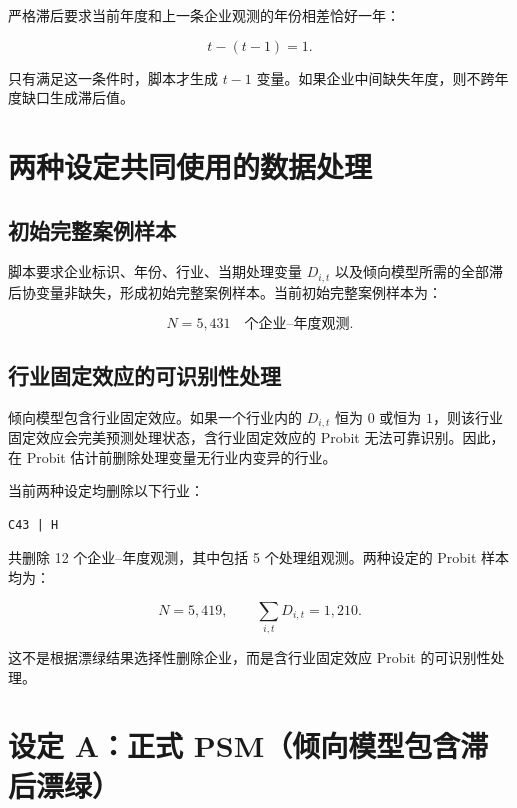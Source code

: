 \documentclass[12pt,a4paper]{article}
\begin{document}
严格滞后要求当前年度和上一条企业观测的年份相差恰好一年：

\begin{equation}
    t-(t-1)=1.
\end{equation}

只有满足这一条件时，脚本才生成 $t-1$ 变量。如果企业中间缺失年度，则不跨年度缺口生成滞后值。

\section{两种设定共同使用的数据处理}

\subsection{初始完整案例样本}

脚本要求企业标识、年份、行业、当期处理变量 $D_{i,t}$ 以及倾向模型所需的全部滞后协变量非缺失，形成初始完整案例样本。当前初始完整案例样本为：

\begin{equation}
    N=5{,}431\quad\text{个企业--年度观测}.
\end{equation}

\subsection{行业固定效应的可识别性处理}

倾向模型包含行业固定效应。如果一个行业内的 $D_{i,t}$ 恒为 $0$ 或恒为 $1$，则该行业固定效应会完美预测处理状态，含行业固定效应的 Probit 无法可靠识别。因此，在 Probit 估计前删除处理变量无行业内变异的行业。

当前两种设定均删除以下行业：

\begin{verbatim}
C43 | H
\end{verbatim}

共删除 12 个企业--年度观测，其中包括 5 个处理组观测。两种设定的 Probit 样本均为：

\begin{equation}
    N=5{,}419,\qquad \sum_{i,t}D_{i,t}=1{,}210.
\end{equation}

这不是根据漂绿结果选择性删除企业，而是含行业固定效应 Probit 的可识别性处理。

\section{设定 A：正式 PSM（倾向模型包含滞后漂绿）}
\end{document}
